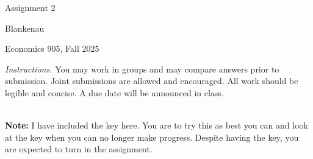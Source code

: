 \documentclass{article}
\begin{document}
\begin{center}
{\LARGE Assignment 2}
\end{center}

\noindent Blankenau

\noindent Economics 905, Fall 2025\medskip

\noindent \textit{Instructions.} You may work in groups and may compare
answers prior to submission. Joint submissions are allowed and encouraged.
All work should be legible and concise. A due date will be announced in
class. \ \ \ \ \ \ \ \ \ \ \ \ \ \ \ \ \ \ \ \ \ \ \ \ \ \ \ \ \ \ \ \ \ \ \
\ \ \ \ \ \ \ \ \ \ \ \ \ \ \ \ \ \ \ \ \ \ \ \ \ \ \ \ \ \ \ 

\textbf{Note: }I have included the key here. You are to try this as best you
can and look at the key when you can no longer make progress. Despite having
the key, you are expected to turn in the assignment.
\end{document}
